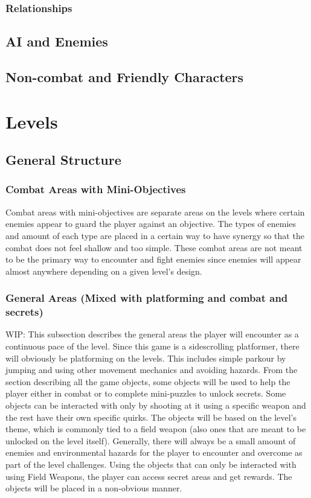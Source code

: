 \documentclass[12pt]{article}
\begin{document}
\subsubsection{Relationships}

\subsection{AI and Enemies}

\subsection{Non-combat and Friendly Characters}

\section{Levels}

\subsection{General Structure}

\subsubsection{Combat Areas with Mini-Objectives}

Combat areas with mini-objectives are separate areas on the levels where certain enemies appear to guard the player against an objective. The types of enemies and amount of each type are placed in a certain way to have synergy so that the combat does not feel shallow and too simple. These combat areas are not meant to be the primary way to encounter and fight enemies since enemies will appear almost anywhere depending on a given level's design. 

\subsubsection{General Areas (Mixed with platforming and combat and secrets)}

WIP: This subsection describes the general areas the player will encounter as a continuous pace of the level. Since this game is a sidescrolling platformer, there will obviously be platforming on the levels. This includes simple parkour by jumping and using other movement mechanics and avoiding hazards. From the section describing all the game objects, some objects will be used to help the player either in combat or to complete mini-puzzles to unlock secrets. Some objects can be interacted with only by shooting at it using a specific weapon and the rest have their own specific quirks. The objects will be based on the level's theme, which is commonly tied to a field weapon (also ones that are meant to be unlocked on the level itself). Generally, there will always be a small amount of enemies and environmental hazards for the player to encounter and overcome as part of the level challenges. Using the objects that can only be interacted with using Field Weapons, the player can access secret areas and get rewards. The objects will be placed in a non-obvious manner. 
\end{document}
